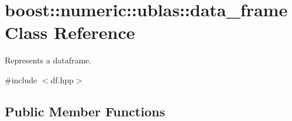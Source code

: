\hypertarget{classboost_1_1numeric_1_1ublas_1_1data__frame}{}\section{boost\+:\+:numeric\+:\+:ublas\+:\+:data\+\_\+frame Class Reference}
\label{classboost_1_1numeric_1_1ublas_1_1data__frame}


Represents a dataframe.  




{\ttfamily \#include $<$df.\+hpp$>$}

\subsection*{Public Member Functions}
